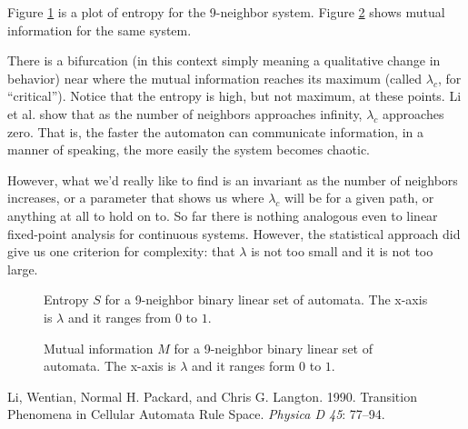 \documentclass[12pt]{article}
\begin{document}
Figure \ref{entropy-9} is a plot of entropy for the 9-neighbor system.
Figure \ref{mutual-9} shows mutual information for the same system.

There is a bifurcation (in this context simply meaning a qualitative
change in behavior) near where the mutual information reaches its
maximum (called $\lambda_c$, for ``critical'').  Notice that the entropy
is high, but not maximum, at these points.  Li et al. show that as the
number of neighbors approaches infinity, $\lambda_c$ approaches zero.
That is, the faster the automaton can communicate information, in a
manner of speaking, the more easily the system becomes chaotic.

However, what we'd really like to find is an invariant as the number of
neighbors increases, or a parameter that shows us where $\lambda_c$ will
be for a given path, or anything at all to hold on to.  So far there is
nothing analogous even to linear fixed-point analysis for continuous
systems.  However, the statistical approach did give us one criterion
for complexity: that $\lambda$ is not too small and it is not too large.

\begin{figure}
\caption{Entropy $S$ for a 9-neighbor binary linear set of automata.  The
x-axis is $\lambda$ and it ranges from $0$ to $1$.}
\label{entropy-9}
\end{figure}

\begin{figure}
\caption{Mutual information $M$ for a 9-neighbor binary linear set of
automata.  The x-axis is $\lambda$ and it ranges form $0$ to $1$.}
\label{mutual-9}
\end{figure}

\begin{thebibliography}{4in}
 Li, Wentian, Normal H. Packard, and Chris G. Langton.
1990.  Transition Phenomena in Cellular Automata Rule Space.
\textit{Physica D 45}: 77--94.
\end{thebibliography}
\end{document}
